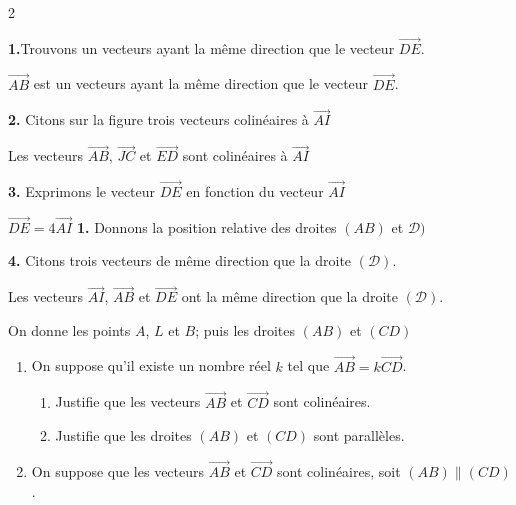 \begin{multicols*}{2}
\begin{enumerate}
  	\end{enumerate}
  	\dure 
  	\resul
  	\textbf{1.}Trouvons un vecteurs ayant la même direction que le vecteur $\overrightarrow{DE}$.
  	
  	$\overrightarrow{AB}$ est un vecteurs ayant la même direction que le vecteur $\overrightarrow{DE}$.
  	
  	\textbf{2.} Citons sur la figure trois vecteurs colinéaires à  $\overrightarrow{AI}$
  	
  	Les vecteurs $\overrightarrow{AB}$, $\overrightarrow{JC}$ et $\overrightarrow{ED}$ sont colinéaires à  $\overrightarrow{AI}$
  	
  	\textbf{3.} Exprimons le vecteur $\overrightarrow{DE}$ en fonction du vecteur $\overrightarrow{AI}$
  	
  	$\overrightarrow{DE}=4\overrightarrow{AI}$
  	\textbf{1.} Donnons la position relative des droites $(AB)$ et $\mathcal{D})$
  	
  	\textbf{4.} Citons trois vecteurs de même direction que la droite $(\mathcal{D})$.
  	
  	Les vecteurs $\overrightarrow{AI}$, $\overrightarrow{AB}$ et $\overrightarrow{DE}$ ont la même direction que la droite $(\mathcal{D})$.
  	
  	
  	
  	On donne les points $A$, $L$ et $B$; puis les droites $(AB)$ et $(CD)$
  	\begin{enumerate}
  		\item On suppose qu'il existe un nombre réel $k$ tel que $\overrightarrow{AB}=k\overrightarrow{CD}$.
  		\begin{enumerate}
  			\item Justifie que les vecteurs $\overrightarrow{AB}$ et $\overrightarrow{CD}$ sont colinéaires.
  			\item Justifie que les droites $(AB)$ et $(CD)$ sont parallèles.
  		\end{enumerate}
  		\item On suppose que les vecteurs $\overrightarrow{AB}$ et $\overrightarrow{CD}$ sont colinéaires, soit $(AB)\parallel(CD)$.
  		

\end{enumerate}
\end{multicols*}
